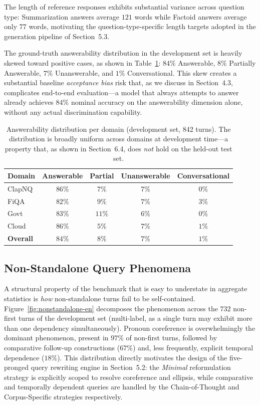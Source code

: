 The length of reference responses exhibits substantial variance across question type: Summarization answers average $121$ words while Factoid answers average only $77$ words, motivating the question-type-specific length targets adopted in the generation pipeline of Section~5.3.

The ground-truth answerability distribution in the development set is heavily skewed toward positive cases, as shown in Table~\ref{tab:answerability-dev-en}: $84\%$ Answerable, $8\%$ Partially Answerable, $7\%$ Unanswerable, and $1\%$ Conversational. This skew creates a substantial baseline \textit{acceptance bias} risk that, as we discuss in Section~4.3, complicates end-to-end evaluation---a model that always attempts to answer already achieves $84\%$ nominal accuracy on the answerability dimension alone, without any actual discrimination capability.

\begin{table}[h]
\centering
\small
\begin{tabular}{lcccc}
\toprule
\textbf{Domain} & \textbf{Answerable} & \textbf{Partial} & \textbf{Unanswerable} & \textbf{Conversational} \\
\midrule
ClapNQ & $86\%$ & $7\%$ & $7\%$ & $0\%$ \\
FiQA & $82\%$ & $9\%$ & $7\%$ & $3\%$ \\
Govt & $83\%$ & $11\%$ & $6\%$ & $0\%$ \\
Cloud & $86\%$ & $5\%$ & $7\%$ & $1\%$ \\
\midrule
\textbf{Overall} & $84\%$ & $8\%$ & $7\%$ & $1\%$ \\
\bottomrule
\end{tabular}
\caption{Answerability distribution per domain (development set, 842 turns). The distribution is broadly uniform across domains at development time---a property that, as shown in Section~6.4, does \emph{not} hold on the held-out test set.}
\label{tab:answerability-dev-en}
\end{table}

\subsection{Non-Standalone Query Phenomena}
\label{sec:nonstandalone-phenomena}

A structural property of the benchmark that is easy to understate in aggregate statistics is \textit{how} non-standalone turns fail to be self-contained. Figure~\ref{fig:nonstandalone-en} decomposes the phenomenon across the $732$ non-first turns of the development set (multi-label, as a single turn may exhibit more than one dependency simultaneously). Pronoun coreference is overwhelmingly the dominant phenomenon, present in $97\%$ of non-first turns, followed by comparative follow-up constructions ($67\%$) and, less frequently, explicit temporal dependence ($18\%$). This distribution directly motivates the design of the five-pronged query rewriting engine in Section~5.2: the \textit{Minimal} reformulation strategy is explicitly scoped to resolve coreference and ellipsis, while comparative and temporally dependent queries are handled by the Chain-of-Thought and Corpus-Specific strategies respectively.

